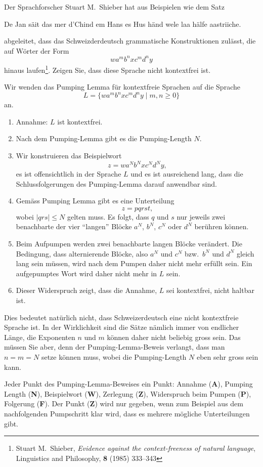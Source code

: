 Der Sprachforscher Stuart M.~Shieber hat aus Beispielen wie dem Satz
\begin{center}
De Jan säit das mer d'Chind em Hans es Hus händ wele laa hälfe aastriiche.
\end{center}
abgeleitet, dass das Schweizderdeutsch grammatische Konstruktionen
zulässt, die auf Wörter der Form
\[
wa^mb^nxc^md^ny
\]
hinaus laufen\footnote{Stuart M.~Shieber,
{\em Evidence against the context-freeness of natural language},
Linguistics and Philosophy, {\bf 8} (1985) 333--343}.
Zeigen Sie, dass diese Sprache nicht kontextfrei ist.


\begin{loesung}
Wir wenden das Pumping Lemma für kontextfreie Sprachen auf die Sprache
\[
L=\{
wa^mb^nxc^md^ny
\;|\; m,n\ge 0
\}
\]
an.
\begin{enumerate}
\item Annahme: $L$ ist kontextfrei.
\item Nach dem Pumping-Lemma gibt es die Pumping-Length $N$.
\item Wir konstruieren das Beispielwort
\[
z=wa^Nb^Nxc^Nd^Ny,
\]
es ist offensichtlich in der Sprache $L$
und es ist ausreichend lang, dass die Schlussfolgerungen des Pumping-Lemma
darauf anwendbar sind.
\item
Gemäss Pumping Lemma gibt es eine Unterteilung
\[
z=pqrst,
\]
wobei $|qrs|\le N$ gelten muss.
Es folgt, dass $q$ und $s$ nur jeweils zwei benachbarte der
vier ``langen'' Blöcke $a^N$, $b^N$, $c^N$ oder $d^N$ berühren können.
\item 
Beim Aufpumpen werden zwei benachbarte langen Blöcke verändert.
Die Bedingung, dass alternierende Blöcke, also $a^N$ und $c^N$
bzw.~$b^N$ und $d^N$ gleich lang sein müssen, wird nach dem Pumpen
daher nicht mehr erfüllt sein.
Ein aufgepumptes Wort wird daher nicht mehr in $L$ sein.
\item Dieser Widerspruch zeigt, dass die Annahme, $L$ sei kontextfrei,
nicht haltbar ist.
\qedhere
\end{enumerate}
\end{loesung}

\begin{diskussion}
Dies bedeutet natürlich nicht, dass Schweizerdeutsch eine nicht
kontextfreie Sprache ist.
In der Wirklichkeit sind die Sätze nämlich immer von endlicher Länge,
die Exponenten $n$ und $m$ können daher nicht beliebig gross sein.
Das müssen Sie aber, denn der Pumping-Lemma-Beweis verlangt, dass man
$n=m=N$ setze können muss, wobei die Pumping-Length $N$ eben sehr gross
sein kann.
\end{diskussion}

\begin{bewertung}
Jeder Punkt des Pumping-Lemma-Beweises ein Punkt:
Annahme ({\bf A}), Pumping Length ({\bf N}), Beispielwort ({\bf W}),
Zerlegung ({\bf Z}), Widerspruch beim Pumpen ({\bf P}), 
Folgerung ({\bf F}).
Der Punkt ({\bf Z}) wird nur gegeben, wenn zum Beispiel aus dem nachfolgenden
Pumpschritt klar wird, dass es mehrere mögliche Unterteilungen gibt.
\end{bewertung}

